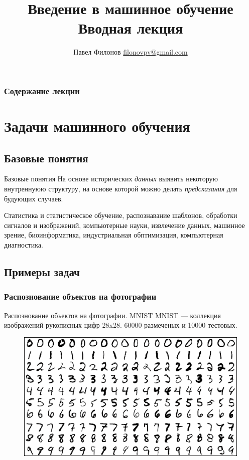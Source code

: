 \documentclass{beamer}
\title{Введение в машинное обучение \\ Вводная лекция}
\author{Павел Филонов \href{mailto:filonovpv@gmail.com}{filonovpv@gmail.com}}
\begin{document}
\begin{frame}
    \titlepage
\end{frame}

\begin{frame}
    \frametitle{Содержание лекции}
    \tableofcontents
\end{frame}

\section{Задачи машинного обучения}
\subsection{Базовые понятия}
\begin{frame}{Базовые понятия}
    На основе исторических {\it данных} выявить некоторую внутреннуюю структуру, на основе которой можно делать {\it предсказания} для будующих случаев.

    Статистика и статистическое обучение, распознавание шаблонов, обработки сигналов и изображений, компьютерные науки, извлечение данных, машинное зрение, биоинформатика, индустриальная обптимизация, компьютерная диагностика.
\end{frame}

\subsection{Примеры задач}
\subsubsection{Распознование объектов на фотографии}
\begin{frame}{Распознование объектов на фотографии. MNIST}
    MNIST --- коллекция изображений рукописных цифр 28x28. 60000 размеченых и 10000 тестовых.
    \begin{figure}
        \includegraphics[width=\linewidth]{fig/mnist.png}
    \end{figure}
\end{frame}
\end{document}
